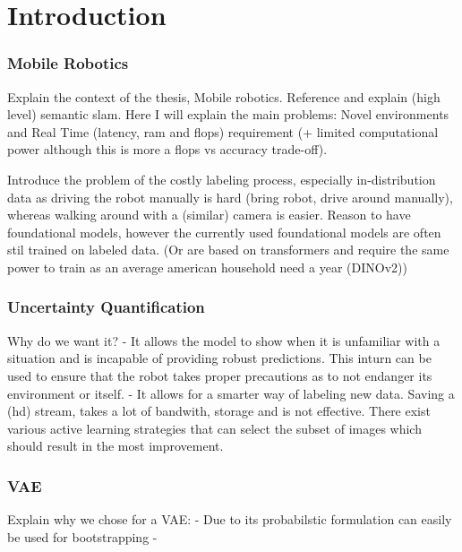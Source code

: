 \chapter{Introduction}\label{chapter:introduction}

\subsection*{Mobile Robotics}
Explain the context of the thesis, Mobile robotics. Reference and explain (high level) semantic slam.
Here I will explain the main problems: Novel environments and Real Time (latency, ram and flops) requirement (+ limited computational power although this is more a flops vs accuracy trade-off).

Introduce the problem of the costly labeling process, especially in-distribution data as driving the robot manually is hard (bring robot, drive around manually), whereas walking around with a (similar) camera is easier. Reason to have foundational models, however the currently used foundational models are often stil trained on labeled data. (Or are based on transformers and require the same power to train as an average american household need a year (DINOv2))

\subsection*{Uncertainty Quantification}
Why do we want it?
- It allows the model to show when it is unfamiliar with a situation and is incapable of providing robust predictions. This inturn can be used to ensure that the robot takes proper precautions as to not endanger its environment or itself.
- It allows for a smarter way of labeling new data. Saving a (hd) stream, takes a lot of bandwith, storage and is not effective. There exist various active learning strategies that can select the subset of images which should result in the most improvement.


\subsection*{VAE}
Explain why we chose for a VAE:
- Due to its probabilstic formulation can easily be used for bootstrapping
- 


